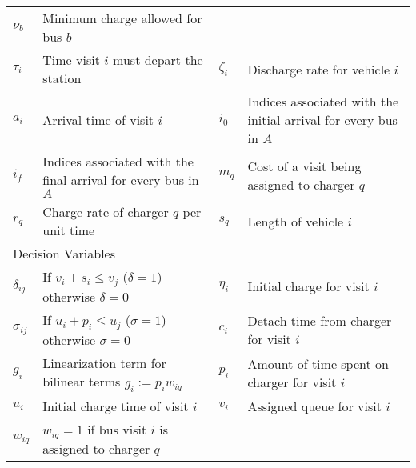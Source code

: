 \begin{table*}[!t]
\begin{tabular}{l l l l}
			$\nu_b$        & Minimum charge allowed for bus $b$                   \\
			$\tau_i$     & Time visit $i$ must depart the station                             &
			$\zeta_i$    & Discharge rate for vehicle $i$                                     \\
			$a_i$        & Arrival time of visit  $i$                                         &
			$i_0$        & Indices associated with the initial arrival for every bus in $A$   \\
			$i_f$        & Indices associated with the final arrival for every bus in $A$     &
			$m_q$        & Cost of a visit being assigned to charger $q$                      \\
			$r_q$        & Charge rate of charger $q$ per unit time                           &
			$s_q$        & Length of vehicle $i$                                              \\
		\hline
		\multicolumn{4}{l}{Decision Variables} \\
			$\delta_{ij}$ & If $v_i + s_i \leq v_j$ ($\delta = 1$) otherwise $\delta = 0$ &
			$\eta_i$      & Initial charge for visit $i$                                 \\
			$\sigma_{ij}$ & If $u_i + p_i \leq u_j$ ($\sigma = 1$) otherwise $\sigma = 0$ &
			$c_i$         & Detach time from charger for visit $i$                       \\
			$g_i$         & Linearization term for bilinear terms $g_i := p_i w_{iq}$     &
			$p_i$         & Amount of time spent on charger for visit $i$                \\
			$u_i$         & Initial charge time of visit $i$                             &
			$v_i$         & Assigned queue for visit $i$                                 \\
     			$w_{iq}$      & $w_{iq} = 1$ if bus visit $i$ is assigned to charger $q$       \\
			\bottomrule
	\end{tabular}
\end{table*}
